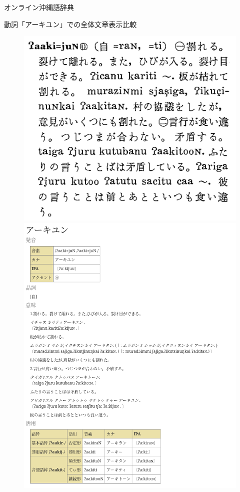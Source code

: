 \documentclass[14pt]{beamer}
\begin{document}
\begin{frame}{オンライン沖縄語辞典}
  \begin{block}{動詞「アーキユン」での全体文章表示比較}
    \begin{figure}[ht]
      \centering
      \begin{minipage}{0.5\textwidth}
        \includegraphics[height=0.5\paperheight,width=0.4\paperwidth]{oki-dict-example-aakiyun-original.png}
      \end{minipage}%
      \begin{minipage}{0.5\textwidth}
        \includegraphics[height=0.65\paperheight]{oki-dict-example-aakiyun-online.png}

\end{minipage}
\end{figure}
\end{block}
\end{frame}
\end{document}
